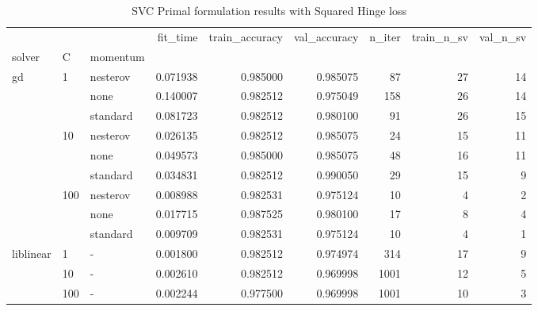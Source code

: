 \begin{table}[h!]
\centering
\caption{SVC Primal formulation results with Squared Hinge loss}
\label{primal_svc_squared_hinge_cv_results}
\begin{tabular}{lllrrrrrr}
\toprule
          &     &   &  fit\_time &  train\_accuracy &  val\_accuracy &  n\_iter &  train\_n\_sv &  val\_n\_sv \\
solver & C & momentum &           &                 &               &         &             &           \\
\midrule
gd & 1   & nesterov &  0.071938 &        0.985000 &      0.985075 &      87 &          27 &        14 \\
          &     & none &  0.140007 &        0.982512 &      0.975049 &     158 &          26 &        14 \\
          &     & standard &  0.081723 &        0.982512 &      0.980100 &      91 &          26 &        15 \\
          & 10  & nesterov &  0.026135 &        0.982512 &      0.985075 &      24 &          15 &        11 \\
          &     & none &  0.049573 &        0.985000 &      0.985075 &      48 &          16 &        11 \\
          &     & standard &  0.034831 &        0.982512 &      0.990050 &      29 &          15 &         9 \\
          & 100 & nesterov &  0.008988 &        0.982531 &      0.975124 &      10 &           4 &         2 \\
          &     & none &  0.017715 &        0.987525 &      0.980100 &      17 &           8 &         4 \\
          &     & standard &  0.009709 &        0.982531 &      0.975124 &      10 &           4 &         1 \\
liblinear & 1   & - &  0.001800 &        0.982512 &      0.974974 &     314 &          17 &         9 \\
          & 10  & - &  0.002610 &        0.982512 &      0.969998 &    1001 &          12 &         5 \\
          & 100 & - &  0.002244 &        0.977500 &      0.969998 &    1001 &          10 &         3 \\
\bottomrule
\end{tabular}
\end{table}
